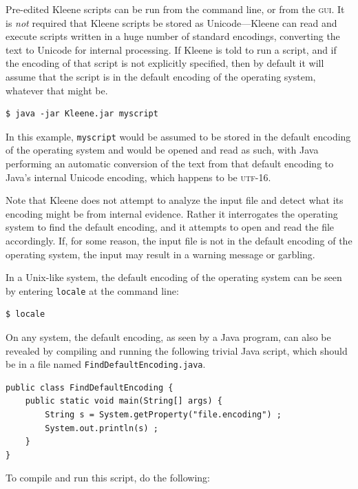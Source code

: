 \documentclass[letterpaper,12pt]{article}
\newcommand{\acro}{\textsc}
\begin{document}
Pre-edited Kleene scripts can be run from the command line, or from the \acro{gui}.
It is \emph{not} required that Kleene scripts be stored as Unicode---Kleene can
read and execute scripts written in a huge number of standard encodings, converting the text to Unicode for
internal processing.  If Kleene is told to run a script, and if the encoding of that script is not
explicitly specified, then by default it will assume that the script is in the
default encoding of the operating system, whatever that might be.

\begin{Verbatim}[fontsize=\small]
$ java -jar Kleene.jar myscript
\end{Verbatim}

\noindent
In this example, \texttt{myscript} would be assumed to be stored in the default encoding
of the operating system and would be opened and read as such, with Java performing
an automatic conversion of the text from that default encoding to Java's internal
Unicode encoding, which happens to be \acro{utf}-16.

Note that Kleene does not attempt to analyze the input file and detect what its encoding
might be from internal evidence.  Rather it interrogates the operating system to
find the default encoding, and it attempts to open and read the file accordingly.  If, for some reason,
the input file is not in the default encoding of the operating system, the input
may result in a warning message or garbling.

In a Unix-like system, the default encoding of the operating system can be seen by
entering \texttt{locale} at the command line:

\begin{Verbatim}[fontsize=\small]
$ locale
\end{Verbatim}

\noindent
On any system, the default encoding, as seen by a Java program, can also be revealed by compiling
and running the following trivial Java script, which should be in a file named
\texttt{FindDefaultEncoding.java}.

\begin{Verbatim}[fontsize=\small]
public class FindDefaultEncoding {
    public static void main(String[] args) {
        String s = System.getProperty("file.encoding") ;
        System.out.println(s) ;
    }
}
\end{Verbatim}

\noindent
To compile and run this script, do the following:
\end{document}
